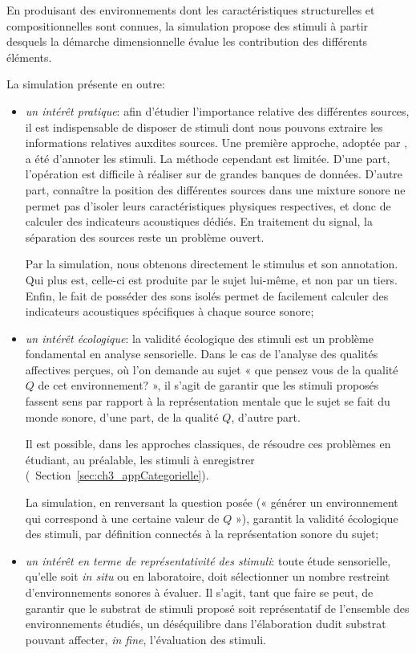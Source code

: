 En produisant des environnements dont les caractéristiques structurelles et compositionnelles sont connues, la simulation propose des stimuli à partir desquels la démarche dimensionnelle évalue les contribution des différents éléments.

La simulation présente en outre:

\begin{itemize}
\item \emph{un intérêt pratique}: afin d'étudier l'importance relative des différentes sources, il est indispensable de disposer de stimuli dont nous pouvons extraire les informations relatives auxdites sources. Une première approche, adoptée par \citep{lavandier2006contribution}, a été d'annoter les stimuli. La méthode cependant est limitée. 
D'une part, l'opération est difficile à réaliser sur de grandes banques de données. D'autre part, connaître la position des différentes sources dans une mixture sonore ne permet pas d'isoler leurs caractéristiques physiques respectives, et donc de calculer des indicateurs acoustiques dédiés. En traitement du signal, la séparation des sources reste un problème ouvert\citep{vincent2014blind}.

Par la simulation, nous obtenons directement le stimulus et son annotation. Qui plus est, celle-ci est produite par le sujet lui-même, et non par un tiers. Enfin, le fait de posséder des sons isolés permet de facilement calculer des indicateurs acoustiques spécifiques à chaque source sonore;

\item \emph{un intérêt écologique}: la validité écologique des stimuli est un problème fondamental en analyse sensorielle. Dans le cas de l'analyse des qualités affectives perçues, où l'on demande au sujet « que pensez vous de la qualité $Q$ de cet environnement? », il s'agit de garantir que les stimuli proposés fassent sens par rapport à la représentation mentale que le sujet se fait du monde sonore, d'une part, de la qualité $Q$, d'autre part.

Il est possible, dans les approches classiques, de résoudre ces problèmes en étudiant, au préalable, les stimuli à enregistrer (\cf~Section~\ref{sec:ch3_appCategorielle}). 

La simulation, en renversant la question posée (« générer un environnement qui correspond à une certaine valeur de $Q$ »), garantit la validité écologique des stimuli, par définition connectés à la représentation sonore du sujet;

\item \emph{un intérêt en terme de représentativité des stimuli}: toute étude sensorielle, qu'elle soit \emph{in situ} ou en laboratoire, doit sélectionner un nombre restreint d'environnements sonores à évaluer. Il s'agit, tant que faire se peut, de garantir que le substrat de stimuli proposé soit représentatif de l'ensemble des environnements étudiés, un déséquilibre dans l'élaboration dudit substrat pouvant affecter, \emph{in fine}, l'évaluation des stimuli. 


\end{itemize}
